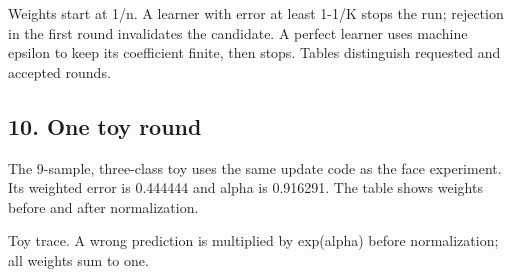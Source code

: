 \documentclass[10pt,twocolumn,letterpaper]{article}
\begin{document}
Weights start at 1/n. A learner with error at least 1-1/K stops the run; rejection in the first round invalidates the candidate. A perfect learner uses machine epsilon to keep its coefficient finite, then stops. Tables distinguish requested and accepted rounds.

\subsection*{10. One toy round}
The 9-sample, three-class toy uses the same update code as the face experiment. Its weighted error is 0.444444 and alpha is 0.916291. The table shows weights before and after normalization.

{\centering
{}
\ifdim\wd\reporttablebox>\columnwidth
\resizebox{\columnwidth}{!}{\usebox{\reporttablebox}}
\else\usebox{\reporttablebox}\fi
\par\small Toy trace. A wrong prediction is multiplied by exp(alpha) before normalization; all weights sum to one.
\par}
\vspace{4pt}
\newpage
\end{document}
